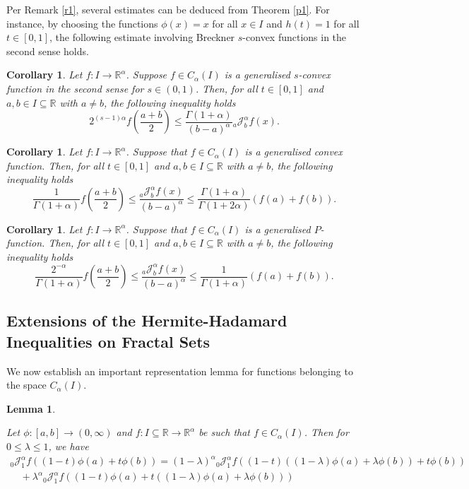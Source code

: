 \documentclass[10pt]{article}
\newtheorem{lem}[theo]{Lemma}
\newtheorem{cor}[theo]{Corollary}
\begin{document}
Per Remark \ref{r1}, several estimates can be deduced from Theorem \ref{p1}. For instance, by choosing the functions $\phi(x)=x$ for all $x\in I$ and $h(t)=1$ for all $t\in[0,1]$,  the following estimate involving Breckner $s$-convex functions in the second sense holds.
\begin{cor}\cite{mo}
Let $f:I\rightarrow\mathbb{R}^\alpha$.  Suppose $f\in C_\alpha(I)$ is a generalised $s$-convex function in the second sense for $s\in(0,1)$. Then, for all $t\in [0, 1]$ and $a, b\in I\subseteq \mathbb{R}$ with $a\neq b$, the following inequality holds
\[
2^{(s-1)\alpha} f\left( \frac{a+b}{2} \right) \leq \frac{\Gamma(1+\alpha)}{(b-a)^\alpha} {}_a \mathcal{J}_b^\alpha f(x).
\] 
\end{cor}
\begin{cor}
Let $f:I\rightarrow\mathbb{R}^\alpha$.  Suppose that $f\in C_\alpha(I)$ is a generalised  convex function. Then, for all $t\in [0, 1]$ and $a, b\in I\subseteq \mathbb{R}$ with $a\neq b$, the following inequality holds
\[
\frac{1}{\Gamma(1+\alpha)} f\left( \frac{a+b}{2} \right) \leq \frac{   {}_a \mathcal{J}_b^\alpha f(x)}{(b-a)^\alpha}\leq \frac{\Gamma(1+\alpha)}{\Gamma(1+2\alpha)} (f(a) +f(b)) .
\] 
\end{cor}

\begin{cor}
Let $f:I\rightarrow\mathbb{R}^\alpha$. Suppose that $f\in C_\alpha(I)$ is a generalised $P$-function. Then, for all $t\in [0, 1]$ and $a, b\in I\subseteq \mathbb{R}$ with $a\neq b$, the following inequality holds
\[
\frac{2^{-\alpha}}{\Gamma(1+\alpha)} f\left( \frac{a+b}{2} \right) \leq \frac{   {}_a \mathcal{J}_b^\alpha f(x)}{(b-a)^\alpha}\leq \frac{1}{\Gamma(1+\alpha)} (f(a) +f(b)) .
\] 
\end{cor}


\subsection{Extensions of the Hermite-Hadamard Inequalities on Fractal Sets}
We now establish an important representation lemma for  functions belonging to the space $ C_\alpha(I)$.
\begin{lem} \label{ojoa}

Let $\phi:[a,b]\rightarrow (0,\infty)$ and $f:I\subseteq\mathbb{R}\rightarrow\mathbb{R}^\alpha$ be such that $f\in C_\alpha(I)$.
Then for $0\leq \lambda \leq 1$, we have
\begin{align}
{}_{0}\mathcal{J}_1 ^{\alpha} f\left((1-t)\phi(a) +t\phi(b)  \right) =(1-\lambda)^\alpha {}_{0}\mathcal{J}_{1} ^\alpha f\left((1-t)((1-\lambda)\phi(a) +\lambda\phi(b))+t\phi(b)\right)  \nonumber
\\\quad +\lambda^\alpha {}_{0}\mathcal{J}_1^\alpha  f\left((1-t)\phi(a) +t((1-\lambda)\phi(a) +\lambda\phi(b)) \right)   \label{ineq1}
\end{align}
\end{lem}
\end{document}
